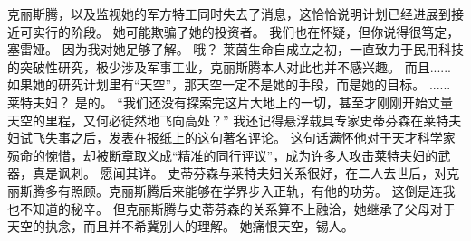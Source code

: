 \documentclass[openany]{book}
\begin{document}
\begin{dialogue}
     克丽斯腾，以及监视她的军方特工同时失去了消息，这恰恰说明计划已经进展到接近可实行的阶段。
     她可能欺骗了她的投资者。
     我们也在怀疑，但你说得很笃定，塞雷娅。
     因为我对她足够了解。
     哦？
     莱茵生命自成立之初，一直致力于民用科技的突破性研究，极少涉及军事工业，克丽斯腾本人对此也并不感兴趣。
     而且......
     如果她的研究计划里有“天空”，那天空一定不是她的手段，而是她的目标。
     ......
     莱特夫妇？
     是的。
     “我们还没有探索完这片大地上的一切，甚至才刚刚开始丈量天空的里程，又何必徒然地飞向高处？”
     我还记得悬浮载具专家史蒂芬森在莱特夫妇试飞失事之后，发表在报纸上的这句著名评论。
     这句话满怀他对于天才科学家殒命的惋惜，却被断章取义成“精准的同行评议”，成为许多人攻击莱特夫妇的武器，真是讽刺。
     愿闻其详。
     史蒂芬森与莱特夫妇关系很好，在二人去世后，对克丽斯腾多有照顾。克丽斯腾后来能够在学界步入正轨，有他的功劳。
     这倒是连我也不知道的秘辛。
     但克丽斯腾与史蒂芬森的关系算不上融洽，她继承了父母对于天空的执念，而且并不希冀别人的理解。
     她痛恨天空，锡人。
\end{dialogue}
\end{document}
